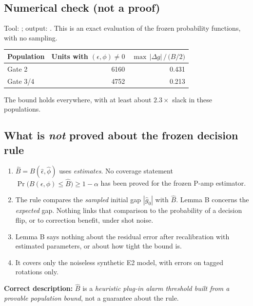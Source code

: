 \documentclass[11pt,a4paper]{article}
\theoremstyle{plain}
\theoremstyle{definition}
\theoremstyle{remark}
\newcommand{\eps}{\epsilon}
\begin{document}
\subsection{Numerical check (not a proof)}
Tool: ; output: .
This is an exact evaluation of the frozen probability functions, with no sampling.

\medskip
\noindent\begin{tabular}{@{}lrr@{}}
\toprule
Population & Units with $(\eps,\phi)\neq0$ & $\max\,|\Delta g| \,/\, \big(B/2\big)$ \\
\midrule
Gate 2 & 6160 & 0.431 \\
Gate 3/4 & 4752 & 0.213 \\
\bottomrule
\end{tabular}

\medskip
The bound holds everywhere, with at least about $2.3\times$ slack in these populations.

\subsection{\texorpdfstring{What is \emph{not} proved about the frozen decision rule}{What is not proved about the frozen decision rule}}
\begin{enumerate}[leftmargin=*,itemsep=2pt]
\item $\hat B=B(\hat\eps,\hat\phi)$ uses \emph{estimates}. No coverage statement
$\Pr\big(B(\eps,\phi)\le\hat B\big)\ge1-\alpha$ has been proved for the frozen P-amp estimator.
\item The rule compares the \emph{sampled} initial gap $|\hat g_0|$ with $\hat B$. Lemma B concerns the
\emph{expected} gap. Nothing links that comparison to the probability of a decision flip, or to
correction benefit, under shot noise.
\item Lemma B says nothing about the residual error after recalibration with estimated parameters,
or about how tight the bound is.
\item It covers only the noiseless synthetic E2 model, with errors on tagged rotations only.
\end{enumerate}
\textbf{Correct description:} $\hat B$ is a \emph{heuristic plug-in alarm threshold built from a provable
population bound}, not a guarantee about the rule.

\newpage
\end{document}
